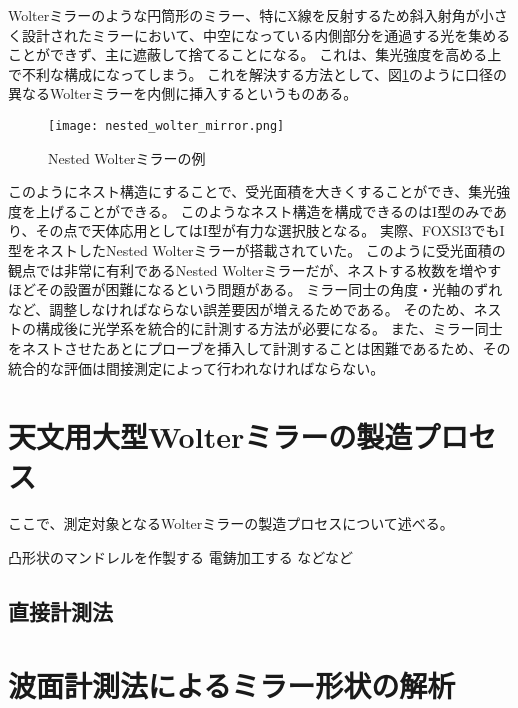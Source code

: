 Wolterミラーのような円筒形のミラー、特にX線を反射するため斜入射角が小さく設計されたミラーにおいて、中空になっている内側部分を通過する光を集めることができず、主に遮蔽して捨てることになる。
これは、集光強度を高める上で不利な構成になってしまう。
これを解決する方法として、図\ref{fig:nested_wolter_mirror}のように口径の異なるWolterミラーを内側に挿入するというものある。

\begin{figure}[b]
\centering
\texttt{[image: nested\_wolter\_mirror.png]}
\caption{Nested Wolterミラーの例}
\label{fig:nested_wolter_mirror}
\end{figure}

このようにネスト構造にすることで、受光面積を大きくすることができ、集光強度を上げることができる。
このようなネスト構造を構成できるのはI型のみであり、その点で天体応用としてはI型が有力な選択肢となる。
実際、FOXSI3でもI型をネストしたNested Wolterミラーが搭載されていた。
このように受光面積の観点では非常に有利であるNested Wolterミラーだが、ネストする枚数を増やすほどその設置が困難になるという問題がある。
ミラー同士の角度・光軸のずれなど、調整しなければならない誤差要因が増えるためである。
そのため、ネストの構成後に光学系を統合的に計測する方法が必要になる。
また、ミラー同士をネストさせたあとにプローブを挿入して計測することは困難であるため、その統合的な評価は間接測定によって行われなければならない。

\clearpage
\newpage
\section{天文用大型Wolterミラーの製造プロセス}
\label{chap1_wolter_fabrication_process}

ここで、測定対象となるWolterミラーの製造プロセスについて述べる。

凸形状のマンドレルを作製する
電鋳加工する
などなど

\subsection{直接計測法}



\clearpage
\newpage
\section{波面計測法によるミラー形状の解析}
\label{chap1_method_for_mirror_metric}




